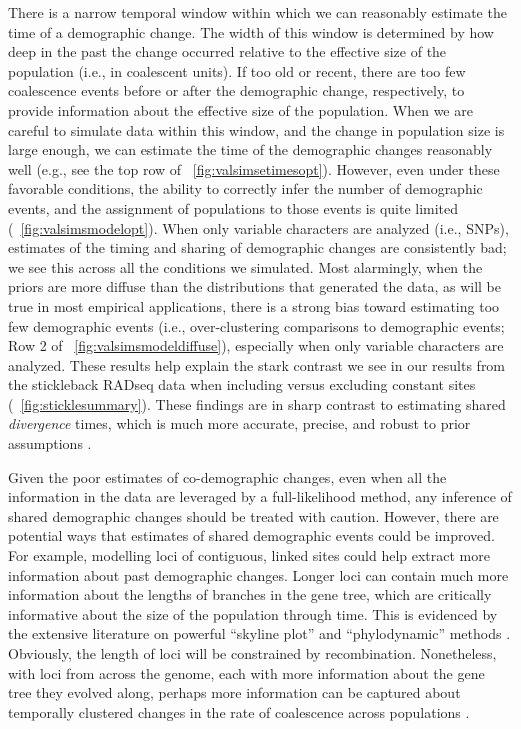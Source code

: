 There is a narrow temporal window within which we can reasonably estimate the
time of a demographic change.
The width of this window is determined by how deep in the past the change
occurred relative to the effective size of the population (i.e., in coalescent
units).
If too old or recent, there are too few coalescence events before or after the
demographic change, respectively, to provide information about the effective
size of the population.
When we are careful to simulate data within this window, and the change in
population size is large enough, we can estimate the time of the demographic
changes reasonably well
(e.g., see the top row of \fig{}~\ref{fig:valsimsetimesopt}).
However, even under these favorable conditions, the ability to correctly infer
the number of demographic events, and the assignment of populations to those
events is quite limited
(\fig{}~\ref{fig:valsimsmodelopt}).
When only variable characters are analyzed (i.e., SNPs), estimates of the
timing and sharing of demographic changes are consistently bad; we see this
across all the conditions we simulated.
Most alarmingly, when the priors are more diffuse than the distributions that
generated the data, as will be true in most empirical applications, there is a
strong bias toward estimating too few demographic events
(i.e., over-clustering comparisons to demographic events;
Row 2 of \fig{}~\ref{fig:valsimsmodeldiffuse}),
especially when only variable characters are analyzed.
These results help explain the stark contrast we see in our results from the
stickleback RADseq data when including versus excluding constant sites
(\fig{}~\ref{fig:sticklesummary}).
These findings are in sharp contrast to estimating shared \emph{divergence}
times, which is much more accurate, precise, and robust to prior assumptions
\citep[\figs {};][]{Oaks2018ecoevolity,Oaks2018paic}.

Given the poor estimates of co-demographic changes, even when all the
information in the data are leveraged by a full-likelihood method, any
inference of shared demographic changes should be treated with caution.
However, there are potential ways that estimates of shared demographic
events could be improved.
For example, modelling loci of contiguous, linked sites could help
extract more information about past demographic changes.
Longer loci can contain much more information about the lengths of branches in
the gene tree, which are critically informative about the size of the
population through time.
This is evidenced by the extensive literature on powerful 
``skyline plot'' and ``phylodynamic'' methods
\citep{Pybus2000,Strimmer2001,OpgenRhein2005,Drummond2005,Heled2008,Minin2008beast,Ho2011,Palacios2012,Palacios2012UAI,Stadler2013,Gill2013,Palacios2014,Lan2015,Karcher2016,Karcher2017,Faulkner2018,Karcher2019}.
Obviously, the length of loci will be constrained by recombination.
Nonetheless, with loci from across the genome, each with more information about
the gene tree they evolved along,
perhaps more information can be captured about temporally clustered changes in
the rate of coalescence across populations \citep{Speidel2019}.

